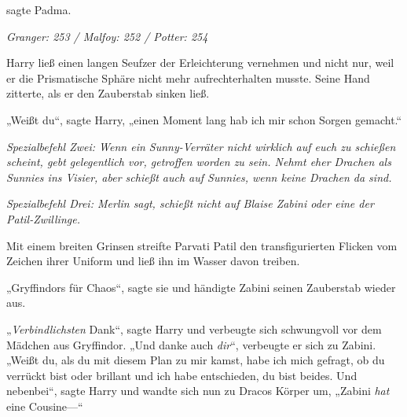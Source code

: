  sagte Padma.

\later

\emph{Granger: 253 / Malfoy: 252 / Potter: 254}

Harry ließ einen langen Seufzer der Erleichterung vernehmen und nicht nur, weil er die Prismatische Sphäre nicht mehr aufrechterhalten musste. Seine Hand zitterte, als er den Zauberstab sinken ließ.

„Weißt du“, sagte Harry, „einen Moment lang hab ich mir schon Sorgen gemacht.“

\emph{Spezialbefehl Zwei: Wenn ein Sunny-Verräter nicht wirklich auf euch zu schießen scheint, gebt gelegentlich vor, getroffen worden zu sein. Nehmt eher Drachen als Sunnies ins Visier, aber schießt auch auf Sunnies, wenn keine Drachen da sind.}

\emph{Spezialbefehl Drei: Merlin sagt, schießt nicht auf Blaise Zabini oder eine der Patil-Zwillinge.}

Mit einem breiten Grinsen streifte Parvati Patil den transfigurierten Flicken vom Zeichen ihrer Uniform und ließ ihn im Wasser davon treiben.

„Gryffindors für Chaos“, sagte sie und händigte Zabini seinen Zauberstab wieder aus.

„\emph{Verbindlichsten} Dank“, sagte Harry und verbeugte sich schwungvoll vor dem Mädchen aus Gryffindor. „Und danke auch \emph{dir}“, verbeugte er sich zu Zabini. „Weißt du, als du mit diesem Plan zu mir kamst, habe ich mich gefragt, ob du verrückt bist oder brillant und ich habe entschieden, du bist beides. Und nebenbei“, sagte Harry und wandte sich nun zu Dracos Körper um, „Zabini \emph{hat} eine Cousine—“


